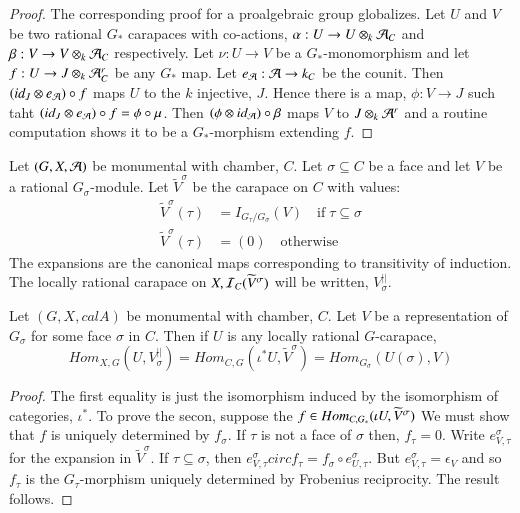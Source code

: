 \begin{proof}
The corresponding proof for a proalgebraic group globalizes. Let $U$ and $V$ be two rational $G_{*}$ carapaces with co-actions, $\alpha : U \rightarrow U \otimes_{k}\mathcal{A}_{C}$ and $\beta : V\rightarrow V  \otimes_{k} \mathcal{A}_{C}$ respectively. Let $\nu:U \rightarrow V$ be a $G_{*}$-monomorphism and let $f : U \rightarrow J \otimes_{k} \mathcal{A}_{C}^{r}$ be any $G_{*}$ map. Let $e_{\mathcal{A}} : \mathcal{A} \rightarrow k_{C}$ be the counit. Then $(id_{J} \otimes e_{\mathcal{A}}) \circ f$ maps $U$ to the $k$ injective, $J$. Hence there is a map, $\phi : V \rightarrow J$ such taht $(id_{J} \otimes e_{\mathcal{A}}) \circ f = \phi  \circ \mu$. Then $(\phi \otimes id_{\mathcal{A}}) \circ \beta$ maps $V$ to $J \otimes_{k}\mathcal{A}^{r}$ and  a routine computation shows it to be a $G_{*}$-morphism extending $f$. 
\end{proof}

\begin{definition}\label{art6-definition-14.4}
Let $(G, X, \mathcal{A})$ be monumental with chamber, $C$. Let $\sigma \subseteq C $ be a face and let $V$ be a rational $G_{\sigma}$-module. Let $\widetilde{V}^{\sigma}$ be the carapace on $C$ with values:
\begin{equation}
\begin{aligned}\label{art6-eq-14.5}
\widetilde{V}^{\sigma}(\tau) &= I_{G_{\tau}/G_{\sigma}}(V) \quad \text{if}\; \tau \subseteq \sigma\\
\widetilde{V}^{\sigma}(\tau) &= (0) \quad \text{otherwise}
\end{aligned}
\end{equation}
The expansions are the canonical maps corresponding to transitivity of induction. The locally rational carapace on $X, \mathcal{I}_{C}(\widetilde{V}^{\sigma})$ will be written, $V_{\sigma}^{||}$.
\end{definition}

\begin{lem}\label{art6-lemma-14.6}
Let $(G, X, calA)$ be monumental with chamber, $C$. Let $V$ be a representation of $G_{\sigma}$ for some face $\sigma$ in $C$. Then if $U$ is any locally rational $G$-carapace,
$$
Hom_{X, G}(U,V_{\sigma}^{||})=Hom_{C, G}(\iota^{*} U, \widetilde{V}^{\sigma}) = Hom_{G_{\sigma}}(U(\sigma), V)
$$
\end{lem}

\begin{proof}
The first equality is just the isomorphism induced by the isomorphism of categories, $\iota^{*}$. To prove the secon, suppose the $f \in Hom_{C, G_{*}}\break (\iota U, \widetilde{V}^{\sigma})$ We must show that $f$ is uniquely determined by $f_{\sigma}$. If $\tau$ is not a face of $\sigma$ then, $f_{\tau} = 0$. Write $e_{V, \tau}^{\sigma}$ for the expansion in $\widetilde{V}^{\sigma}$. If $\tau \subseteq \sigma$, then $e_{V, \tau}^{\sigma} circ f_{\tau} = f_{\sigma} \circ e_{U, \tau}^{\sigma}$. But $e_{V, \tau}^{\sigma} = \epsilon_{V}$ and so $f_{\tau}$ is the $G_{\tau}$-morphism uniquely determined by Frobenius reciprocity. The result follows.
\end{proof}


